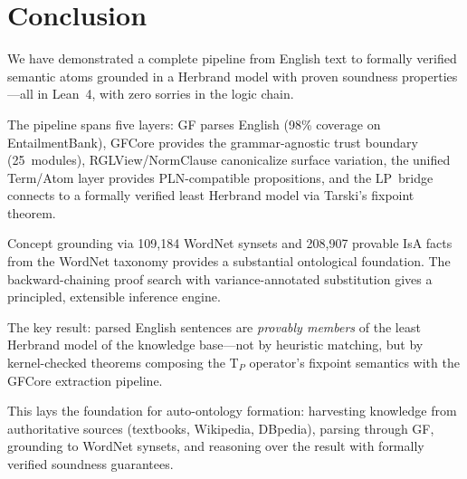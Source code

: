 \documentclass[]{article}
\newcommand{\GFCore}{\textup{GFCore}}
\begin{document}
\section{Conclusion}

We have demonstrated a complete pipeline from English text to
formally verified semantic atoms grounded in a Herbrand model with
proven soundness properties---all in Lean~4, with zero sorries in
the logic chain.

The pipeline spans five layers: GF parses English (98\% coverage on
EntailmentBank), \GFCore{} provides the grammar-agnostic trust boundary
(25~modules), RGLView/NormClause canonicalize surface variation, the
unified Term/Atom layer provides PLN-compatible propositions, and the
LP~bridge connects to a formally verified least Herbrand model via
Tarski's fixpoint theorem.

Concept grounding via 109,184 WordNet synsets and 208,907 provable
IsA facts from the WordNet taxonomy provides a substantial ontological
foundation.  The backward-chaining proof search with variance-annotated
substitution gives a principled, extensible inference engine.

The key result: parsed English sentences are \emph{provably members}
of the least Herbrand model of the knowledge base---not by heuristic
matching, but by kernel-checked theorems composing the T$_P$ operator's
fixpoint semantics with the GFCore extraction pipeline.

This lays the foundation for auto-ontology formation: harvesting
knowledge from authoritative sources (textbooks, Wikipedia, DBpedia),
parsing through GF, grounding to WordNet synsets, and reasoning over
the result with formally verified soundness guarantees.
\end{document}
